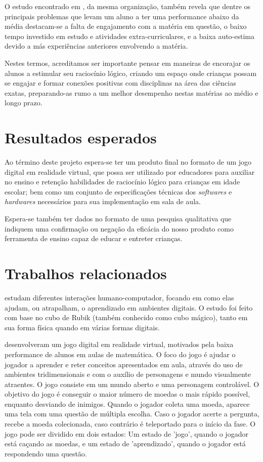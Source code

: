 O estudo encontrado em \cite{OECD:2016:low_performing_students}, 
da mesma organização, também revela que dentre os principais 
problemas que levam um aluno a ter uma performance abaixo da média 
destacam-se a falta de engajamento com a matéria em questão, 
o baixo tempo investido em estudo e atividades extra-curriculares, 
e a baixa auto-estima devido a más experiências anteriores 
envolvendo a matéria.

Nestes termos, acreditamos ser importante pensar em maneiras 
de encorajar os alunos a estimular seu raciocínio lógico, 
criando um espaço onde crianças possam se engajar e formar 
conexões positivas com disciplinas na área das ciências 
exatas, preparando-as rumo a um melhor desempenho nestas 
matérias ao médio e longo prazo.

\section{Resultados esperados}\label{sec-resultados-esperados}

Ao término deste projeto espera-se ter um produto final no 
formato de um jogo digital em realidade virtual, que possa 
ser utilizado por educadores para auxiliar no ensino e retenção 
habilidades de raciocínio lógico para crianças em idade escolar; 
bem como um conjunto de especificações técnicas dos 
\textit{softwares} e \textit{hardwares} necessários para sua 
implementação em sala de aula.

Espera-se também ter dados no formato de uma pesquisa 
qualitativa que indiquem uma confirmação ou negação da 
eficácia do nosso produto como ferramenta de ensino capaz 
de educar e entreter crianças.

\section{Trabalhos relacionados}\label{sec-trabalhos-relacionados}

\cite{Tabuti:2010:analise} estudam diferentes interações humano-computador, 
focando em como elas ajudam, ou atrapalham, o aprendizado em ambientes 
digitais. O estudo foi feito com base no cubo de Rubik 
(também conhecido como cubo mágico), tanto em sua forma física 
quando em várias formas digitais.

\cite{SBGames:2015:RVAM} desenvolveram um jogo digital em realidade 
virtual, motivados pela baixa performance de alunos em aulas de matemática. 
O foco do jogo é ajudar o jogador a aprender e reter conceitos apresentados 
em aula, através do uso de ambientes tridimensionais e com o auxílio de 
personagens e mundo visualmente atraentes. O jogo consiste em um mundo 
aberto e uma personagem controlável. O objetivo do jogo é conseguir o 
maior número de moedas o mais rápido possível, enquanto desviando de 
inimigos. Quando o jogador coleta uma moeda, aparece uma tela com uma questão 
de múltipla escolha. Caso o jogador acerte a pergunta, recebe a moeda 
colecionada, caso contrário é teleportado para o início da fase. O jogo pode 
ser dividido em dois estados: Um estado de 'jogo', quando o jogador está 
caçando as moedas, e um estado de 'aprendizado', quando o jogador está 
respondendo uma questão.

